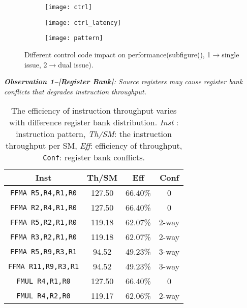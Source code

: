 \begin{figure*}
    \begin{subfigure}[htbp]{0.3\textwidth}
        \texttt{[image: ctrl]}
        \subcaption{}
        \label{fig:control_throughput}
    \end{subfigure}
    \begin{subfigure}[htbp]{0.3\textwidth}
        \texttt{[image: ctrl\_latency]}
        \subcaption{}
        \label{fig:control_latency}
    \end{subfigure}
    \begin{subfigure}[htbp]{0.3\textwidth}
        \texttt{[image: pattern]}
        \subcaption{}
        \label{fig:control_pattern}
    \end{subfigure}
    \caption{Different control code impact on performance(subfigure(), 1$\rightarrow$single
    issue, 2$\rightarrow$dual issue).}
    \label{fig:control_code}
\end{figure*}


{\em {\bf Observation 1--[Register Bank]}:
Source registers may cause register bank conflicts that degrades instruction throughput.}
\begin{table}[htbp]
    \caption{The efficiency of instruction throughput varies with difference register bank distribution. {\it Inst} :
instruction pattern, {\it Th/SM}: the instruction throughput per SM, {\it Eff}: efficiency of throughput, {\tt Conf}: register bank conflicts.}
\centering
\scalebox{0.9} {
\begin{tabular}{|c|c|c|c|}
\hline
Inst &Th/SM&Eff&Conf\\
\hline
{\tt FFMA R5,R4,R1,R0}&127.50&66.40\%&0\\
\hline
{\tt FFMA R2,R4,R1,R0}&127.50&66.40\%&0\\
\hline
{\tt FFMA R5,R2,R1,R0}&119.18&62.07\%&2-way\\
\hline
{\tt FFMA R3,R2,R1,R0}&119.18&62.07\%&2-way\\
\hline
{\tt FFMA R5,R9,R3,R1}&94.52&49.23\%&3-way\\
\hline
{\tt FFMA R11,R9,R3,R1}&94.52&49.23\%&3-way\\
\hline
{\tt FMUL R4,R1,R0}&127.50&66.40\%&0\\
\hline
{\tt FMUL R4,R2,R0}&119.17&62.06\%&2-way\\
\hline
\end{tabular}
}
\label{tab:th}
\end{table}


